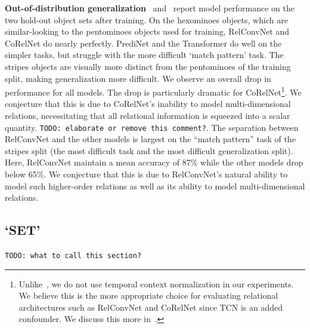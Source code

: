 \textbf{Out-of-distribution generalization}~ and~ report model performance on the two hold-out object sets after training. On the hexominoes objects, which are similar-looking to the pentominoes objects used for training, RelConvNet and CoRelNet do nearly perfectly. PrediNet and the Transformer do well on the simpler tasks, but struggle with the more difficult `match pattern' task. The stripes objects are visually more distinct from the pentominoes of the training split, making generalization more difficult. We observe an overall drop in performance for all models. The drop is particularly dramatic for CoRelNet\footnote{Unlike~\citep{kergNeuralArchitecture2022}, we do not use temporal context normalization in our experiments. We believe this is the more appropriate choice for evaluating relational architectures such as RelConvNet and CoRelNet since TCN is an added confounder. We discuss this more in~.}. We conjecture that this is due to CoRelNet's inability to model multi-dimensional relations, necessitating that all relational information is squeezed into a scalar quantity. \texttt{TODO: elaborate or remove this comment?}. The separation between RelConvNet and the other models is largest on the ``match pattern'' task of the stripes split (the most difficult task and the most difficult generalization split). Here, RelConvNet maintain a mean accuracy of 87\% while the other models drop below 65\%. We conjecture that this is due to RelConvNet's natural ability to model such higher-order relations as well as its ability to model multi-dimensional relations.


\subsection{`SET'}\label{ssec:experiments_set}
\texttt{TODO: what to call this section?}

